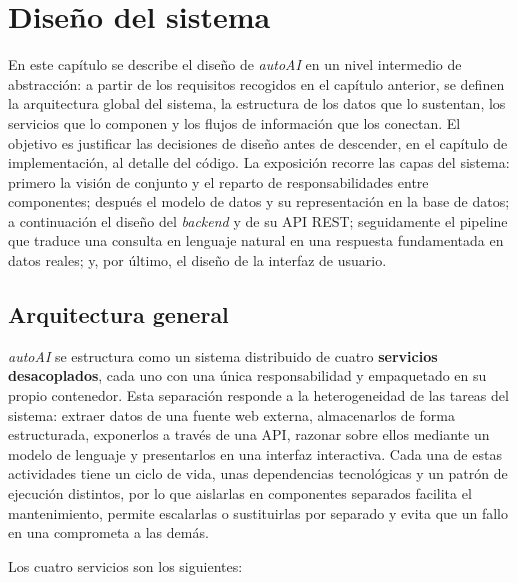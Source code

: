 
\chapter{Diseño del sistema}
\label{cap:diseno}

En este capítulo se describe el diseño de \emph{autoAI} en un nivel intermedio
de abstracción: a partir de los requisitos recogidos en el capítulo anterior, se
definen la arquitectura global del sistema, la estructura de los datos que lo
sustentan, los servicios que lo componen y los flujos de información que los
conectan. El objetivo es justificar las decisiones de diseño antes de descender,
en el capítulo de implementación, al detalle del código. La exposición recorre
las capas del sistema: primero la visión de conjunto y el reparto de
responsabilidades entre componentes; después el modelo de datos y su
representación en la base de datos; a continuación el diseño del \emph{backend} y
de su API REST; seguidamente el pipeline que traduce una consulta en lenguaje
natural en una respuesta fundamentada en datos reales; y, por último, el diseño
de la interfaz de usuario.

\section{Arquitectura general}
\label{sec:arquitectura-general}

\emph{autoAI} se estructura como un sistema distribuido de cuatro
\textbf{servicios desacoplados}, cada uno con una única responsabilidad y
empaquetado en su propio contenedor. Esta separación responde a la heterogeneidad
de las tareas del sistema: extraer datos de una fuente web externa, almacenarlos
de forma estructurada, exponerlos a través de una API, razonar sobre ellos
mediante un modelo de lenguaje y presentarlos en una interfaz interactiva. Cada
una de estas actividades tiene un ciclo de vida, unas dependencias tecnológicas y
un patrón de ejecución distintos, por lo que aislarlas en componentes separados
facilita el mantenimiento, permite escalarlas o sustituirlas por separado y evita
que un fallo en una comprometa a las demás.

Los cuatro servicios son los siguientes:

